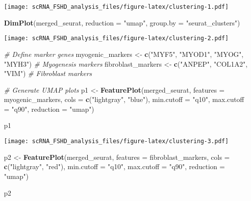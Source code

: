 \documentclass[
]{article}
\newenvironment{Shaded}{\begin{snugshade}}{\end{snugshade}}
\newcommand{\AttributeTok}[1]{\textcolor[rgb]{0.13,0.29,0.53}{#1}}
\newcommand{\CommentTok}[1]{\textcolor[rgb]{0.56,0.35,0.01}{\textit{#1}}}
\newcommand{\FunctionTok}[1]{\textcolor[rgb]{0.13,0.29,0.53}{\textbf{#1}}}
\newcommand{\NormalTok}[1]{#1}
\newcommand{\OtherTok}[1]{\textcolor[rgb]{0.56,0.35,0.01}{#1}}
\newcommand{\StringTok}[1]{\textcolor[rgb]{0.31,0.60,0.02}{#1}}
\begin{document}
\texttt{[image: scRNA\_FSHD\_analysis\_files/figure-latex/clustering-1.pdf]}

\begin{Shaded}
\begin{Highlighting}[]
\FunctionTok{DimPlot}\NormalTok{(merged\_seurat, }\AttributeTok{reduction =} \StringTok{"umap"}\NormalTok{, }\AttributeTok{group.by =} \StringTok{"seurat\_clusters"}\NormalTok{)}
\end{Highlighting}
\end{Shaded}

\texttt{[image: scRNA\_FSHD\_analysis\_files/figure-latex/clustering-2.pdf]}

\begin{Shaded}
\begin{Highlighting}[]
\CommentTok{\# Define marker genes}
\NormalTok{myogenic\_markers }\OtherTok{\textless{}{-}} \FunctionTok{c}\NormalTok{(}\StringTok{"MYF5"}\NormalTok{, }\StringTok{"MYOD1"}\NormalTok{, }\StringTok{"MYOG"}\NormalTok{, }\StringTok{"MYH3"}\NormalTok{)  }\CommentTok{\# Myogenesis markers}
\NormalTok{fibroblast\_markers }\OtherTok{\textless{}{-}} \FunctionTok{c}\NormalTok{(}\StringTok{"ANPEP"}\NormalTok{, }\StringTok{"COL1A2"}\NormalTok{, }\StringTok{"VIM"}\NormalTok{)  }\CommentTok{\# Fibroblast markers}

\CommentTok{\# Generate UMAP plots}
\NormalTok{p1 }\OtherTok{\textless{}{-}} \FunctionTok{FeaturePlot}\NormalTok{(merged\_seurat, }\AttributeTok{features =}\NormalTok{ myogenic\_markers, }\AttributeTok{cols =} \FunctionTok{c}\NormalTok{(}\StringTok{"lightgray"}\NormalTok{, }\StringTok{"blue"}\NormalTok{), }\AttributeTok{min.cutoff =} \StringTok{"q10"}\NormalTok{, }\AttributeTok{max.cutoff =} \StringTok{"q90"}\NormalTok{, }\AttributeTok{reduction =} \StringTok{"umap"}\NormalTok{)}

\NormalTok{p1}
\end{Highlighting}
\end{Shaded}

\texttt{[image: scRNA\_FSHD\_analysis\_files/figure-latex/clustering-3.pdf]}

\begin{Shaded}
\begin{Highlighting}[]
\NormalTok{p2 }\OtherTok{\textless{}{-}} \FunctionTok{FeaturePlot}\NormalTok{(merged\_seurat, }\AttributeTok{features =}\NormalTok{ fibroblast\_markers, }\AttributeTok{cols =} \FunctionTok{c}\NormalTok{(}\StringTok{"lightgray"}\NormalTok{, }\StringTok{"red"}\NormalTok{), }\AttributeTok{min.cutoff =} \StringTok{"q10"}\NormalTok{, }\AttributeTok{max.cutoff =} \StringTok{"q90"}\NormalTok{, }\AttributeTok{reduction =} \StringTok{"umap"}\NormalTok{)}

\NormalTok{p2}
\end{Highlighting}
\end{Shaded}
\end{document}
